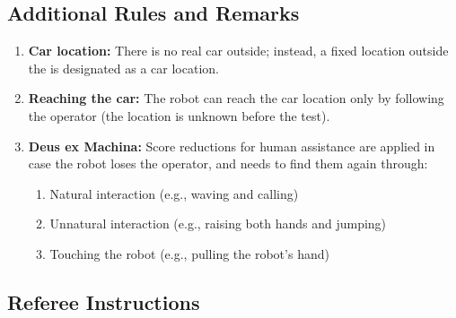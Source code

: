 \subsection*{Additional Rules and Remarks}
\begin{enumerate}[nosep]

	\item \textbf{Car location:} There is no real car outside; instead, a fixed location outside the \Arena{} is designated as a car location.

	\item \textbf{Reaching the car:} The robot can reach the car location only by following the operator (the location is unknown before the test).
	
	\item \textbf{Deus ex Machina:} Score reductions for human assistance are applied in case the robot loses the operator, and needs to find them again through:
    \begin{enumerate}
     \item Natural interaction (e.g., waving and calling)
     \item Unnatural interaction (e.g., raising both hands and jumping)
     \item Touching the robot (e.g., pulling the robot's hand)
    \end{enumerate}
\end{enumerate}


\subsection*{Referee Instructions}

